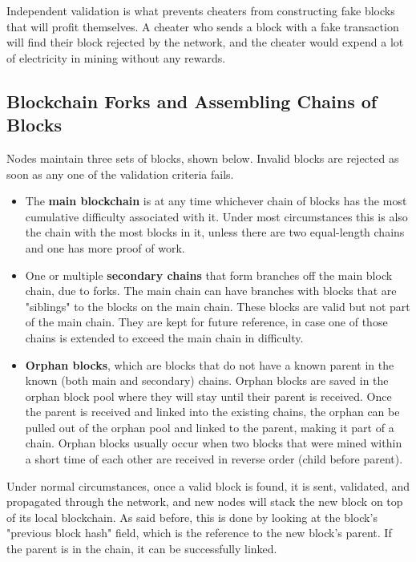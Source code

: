 \documentclass{article}
\begin{document}
    Independent validation is what prevents cheaters from constructing fake blocks that will profit themselves. A cheater who sends a block with a fake transaction will find their block rejected by the network, and the cheater would expend a lot of electricity in mining without any rewards.

  \subsection{Blockchain Forks and Assembling Chains of Blocks}

    Nodes maintain three sets of blocks, shown below. Invalid blocks are rejected as soon as any one of the validation criteria fails.

    \begin{itemize}
      \item The \textbf{main blockchain} is at any time whichever chain of blocks has the most cumulative difficulty associated with it. Under most circumstances this is also the chain with the most blocks in it, unless there are two equal-length chains and one has more proof of work.
      \item One or multiple \textbf{secondary chains} that form branches off the main block chain, due to forks. The main chain can have branches with blocks that are "siblings" to the blocks on the main chain. These blocks are valid but not part of the main chain. They are kept for future reference, in case one of those chains is extended to exceed the main chain in difficulty.
      \item \textbf{Orphan blocks}, which are blocks that do not have a known parent in the known (both main and secondary) chains. Orphan blocks are saved in the orphan block pool where they will stay until their parent is received. Once the parent is received and linked into the existing chains, the orphan can be pulled out of the orphan pool and linked to the parent, making it part of a chain. Orphan blocks usually occur when two blocks that were mined within a short time of each other are received in reverse order (child before parent).
    \end{itemize}

    Under normal circumstances, once a valid block is found, it is sent, validated, and propagated through the network, and new nodes will stack the new block on top of its local blockchain. As said before, this is done by looking at the block's "previous block hash" field, which is the reference to the new block's parent. If the parent is in the chain, it can be successfully linked.
\end{document}
